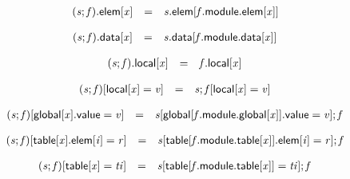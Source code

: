 $$
\begin{array}{@{}lcl@{}l@{}}
{({\mathit{s}} ; {\mathit{f}}).\mathsf{elem}}{[{\mathit{x}}]} &=& {\mathit{s}}.\mathsf{elem}[{\mathit{f}}.\mathsf{module}.\mathsf{elem}[{\mathit{x}}]] &  \\
\end{array}
$$

$$
\begin{array}{@{}lcl@{}l@{}}
{({\mathit{s}} ; {\mathit{f}}).\mathsf{data}}{[{\mathit{x}}]} &=& {\mathit{s}}.\mathsf{data}[{\mathit{f}}.\mathsf{module}.\mathsf{data}[{\mathit{x}}]] &  \\
\end{array}
$$

$$
\begin{array}{@{}lcl@{}l@{}}
{({\mathit{s}} ; {\mathit{f}}).\mathsf{local}}{[{\mathit{x}}]} &=& {\mathit{f}}.\mathsf{local}[{\mathit{x}}] &  \\
\end{array}
$$

\vspace{1ex}

$$
\begin{array}{@{}lcl@{}l@{}}
({\mathit{s}} ; {\mathit{f}})[\mathsf{local}[{\mathit{x}}] = {\mathit{v}}] &=& {\mathit{s}} ; {\mathit{f}}[\mathsf{local}[{\mathit{x}}] = {\mathit{v}}] &  \\
\end{array}
$$

$$
\begin{array}{@{}lcl@{}l@{}}
({\mathit{s}} ; {\mathit{f}})[\mathsf{global}[{\mathit{x}}].\mathsf{value} = {\mathit{v}}] &=& {\mathit{s}}[\mathsf{global}[{\mathit{f}}.\mathsf{module}.\mathsf{global}[{\mathit{x}}]].\mathsf{value} = {\mathit{v}}] ; {\mathit{f}} &  \\
\end{array}
$$

$$
\begin{array}{@{}lcl@{}l@{}}
({\mathit{s}} ; {\mathit{f}})[\mathsf{table}[{\mathit{x}}].\mathsf{elem}[{\mathit{i}}] = {\mathit{r}}] &=& {\mathit{s}}[\mathsf{table}[{\mathit{f}}.\mathsf{module}.\mathsf{table}[{\mathit{x}}]].\mathsf{elem}[{\mathit{i}}] = {\mathit{r}}] ; {\mathit{f}} &  \\
\end{array}
$$

$$
\begin{array}{@{}lcl@{}l@{}}
({\mathit{s}} ; {\mathit{f}})[\mathsf{table}[{\mathit{x}}] = {\mathit{ti}}] &=& {\mathit{s}}[\mathsf{table}[{\mathit{f}}.\mathsf{module}.\mathsf{table}[{\mathit{x}}]] = {\mathit{ti}}] ; {\mathit{f}} &  \\
\end{array}
$$

